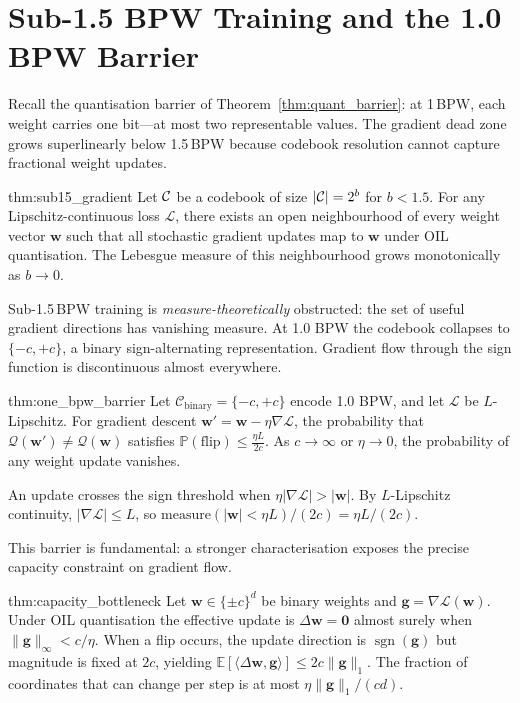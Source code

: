 \section{Sub-1.5 BPW Training and the 1.0 BPW Barrier}
\label{sec:sub_1_5_bpw}
Recall the quantisation barrier of Theorem~\ref{thm:quant_barrier}: at
1\,BPW, each weight carries one bit---at most two representable values.
The gradient dead zone grows superlinearly below 1.5\,BPW because codebook
resolution cannot capture fractional weight updates.
\begin{mythm}{thm:sub15_gradient}
Let $\mathcal{C}$ be a codebook of size $|\mathcal{C}| = 2^{b}$ for $b < 1.5$.
For any Lipschitz-continuous loss $\mathcal{L}$, there exists an open
neighbourhood of every weight vector $\mathbf{w}$ such that all stochastic
gradient updates map to $\mathbf{w}$ under OIL quantisation. The Lebesgue
measure of this neighbourhood grows monotonically as $b \to 0$.
\end{mythm}
Sub-1.5\,BPW training is \emph{measure-theoretically} obstructed: the set
of useful gradient directions has vanishing measure. At 1.0 BPW the
codebook collapses to $\{-c, +c\}$, a binary sign-alternating
representation. Gradient flow through the sign function is discontinuous
almost everywhere.
\begin{mythm}{thm:one_bpw_barrier}
Let $\mathcal{C}_{\text{binary}} = \{-c, +c\}$ encode 1.0 BPW, and let
$\mathcal{L}$ be $L$-Lipschitz. For gradient descent $\mathbf{w}' =
\mathbf{w} - \eta \nabla \mathcal{L}$, the probability that
$\mathcal{Q}(\mathbf{w}') \neq \mathcal{Q}(\mathbf{w})$ satisfies
$\mathbb{P}(\text{flip}) \leq \frac{\eta L}{2c}$. As $c \to \infty$ or
$\eta \to 0$, the probability of any weight update vanishes.
\end{mythm}
\begin{proofsketch}
An update crosses the sign threshold when $\eta |\nabla\mathcal{L}| >
|\mathbf{w}|$. By $L$-Lipschitz continuity, $|\nabla\mathcal{L}| \leq L$,
so $\text{measure}(|\mathbf{w}| < \eta L) / (2c) = \eta L / (2c)$.
\end{proofsketch}
This barrier is fundamental: a stronger characterisation exposes the
precise capacity constraint on gradient flow.
\begin{mythm}{thm:capacity_bottleneck}
Let $\mathbf{w} \in \{\pm c\}^d$ be binary weights and
$\mathbf{g} = \nabla\mathcal{L}(\mathbf{w})$. Under OIL quantisation the
effective update is $\Delta\mathbf{w} = \mathbf{0}$ almost surely when
$\|\mathbf{g}\|_\infty < c/\eta$. When a flip occurs, the update direction
is $\operatorname{sgn}(\mathbf{g})$ but magnitude is fixed at $2c$, yielding
$\mathbb{E}[\langle \Delta\mathbf{w}, \mathbf{g} \rangle] \leq
2c\|\mathbf{g}\|_1$. The fraction of coordinates that can change per step
is at most $\eta\|\mathbf{g}\|_1 / (c d)$.
\end{mythm}
